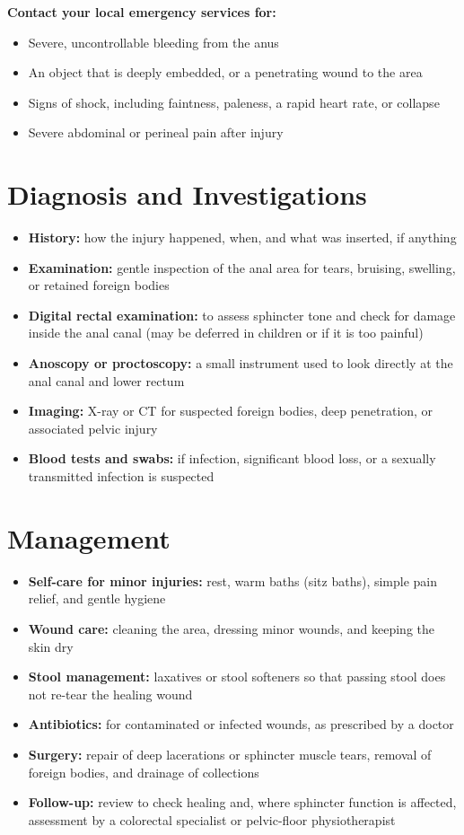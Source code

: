 \textbf{Contact your local emergency services for:}
\begin{itemize}
    \item Severe, uncontrollable bleeding from the anus
    \item An object that is deeply embedded, or a penetrating wound to the area
    \item Signs of shock, including faintness, paleness, a rapid heart rate, or collapse
    \item Severe abdominal or perineal pain after injury
\end{itemize}

\section*{Diagnosis and Investigations}
\begin{itemize}
    \item \textbf{History:} how the injury happened, when, and what was inserted, if anything
    \item \textbf{Examination:} gentle inspection of the anal area for tears, bruising, swelling, or retained foreign bodies
    \item \textbf{Digital rectal examination:} to assess sphincter tone and check for damage inside the anal canal (may be deferred in children or if it is too painful)
    \item \textbf{Anoscopy or proctoscopy:} a small instrument used to look directly at the anal canal and lower rectum
    \item \textbf{Imaging:} X-ray or CT for suspected foreign bodies, deep penetration, or associated pelvic injury
    \item \textbf{Blood tests and swabs:} if infection, significant blood loss, or a sexually transmitted infection is suspected
\end{itemize}

\section*{Management}
\begin{itemize}
    \item \textbf{Self-care for minor injuries:} rest, warm baths (sitz baths), simple pain relief, and gentle hygiene
    \item \textbf{Wound care:} cleaning the area, dressing minor wounds, and keeping the skin dry
    \item \textbf{Stool management:} laxatives or stool softeners so that passing stool does not re-tear the healing wound
    \item \textbf{Antibiotics:} for contaminated or infected wounds, as prescribed by a doctor
    \item \textbf{Surgery:} repair of deep lacerations or sphincter muscle tears, removal of foreign bodies, and drainage of collections
    \item \textbf{Follow-up:} review to check healing and, where sphincter function is affected, assessment by a colorectal specialist or pelvic-floor physiotherapist
\end{itemize}

